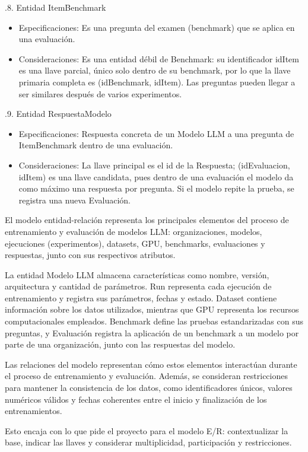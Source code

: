 \documentclass[12pt,a4paper]{article}
\begin{document}
.8. Entidad ItemBenchmark
{\begin{itemize}
  \item Especificaciones: Es una pregunta del examen (benchmark) que se aplica en una evaluación.
  \item Consideraciones: Es una entidad débil de Benchmark: su identificador idItem es una llave parcial, único solo dentro de su benchmark, por lo que la llave primaria completa es (idBenchmark, idItem). Las preguntas pueden llegar a ser similares después de varios experimentos.
\end{itemize}
}

.9. Entidad RespuestaModelo
{\begin{itemize}
  \item Especificaciones: Respuesta concreta de un Modelo LLM a una pregunta de ItemBenchmark dentro de una evaluación.
  \item Consideraciones: La llave principal es el id de la Respuesta; (idEvaluacion, idItem) es una llave candidata, pues dentro de una evaluación el modelo da como máximo una respuesta por pregunta. Si el modelo repite la prueba, se registra una nueva Evaluación.
\end{itemize}
}

El modelo entidad-relación representa los principales elementos del proceso de entrenamiento y evaluación de modelos LLM: organizaciones, modelos, ejecuciones (experimentos), datasets, GPU, benchmarks, evaluaciones y respuestas, junto con sus respectivos atributos.

La entidad Modelo LLM almacena características como nombre, versión, arquitectura y cantidad de parámetros. Run representa cada ejecución de entrenamiento y registra sus parámetros, fechas y estado. Dataset contiene información sobre los datos utilizados, mientras que GPU representa los recursos computacionales empleados. Benchmark define las pruebas estandarizadas con sus preguntas, y Evaluación registra la aplicación de un benchmark a un modelo por parte de una organización, junto con las respuestas del modelo.

Las relaciones del modelo representan cómo estos elementos interactúan durante el proceso de entrenamiento y evaluación. Además, se consideran restricciones para mantener la consistencia de los datos, como identificadores únicos, valores numéricos válidos y fechas coherentes entre el inicio y finalización de los entrenamientos.

Esto encaja con lo que pide el proyecto para el modelo E/R: contextualizar la base, indicar las llaves y considerar multiplicidad, participación y restricciones.
\end{document}
